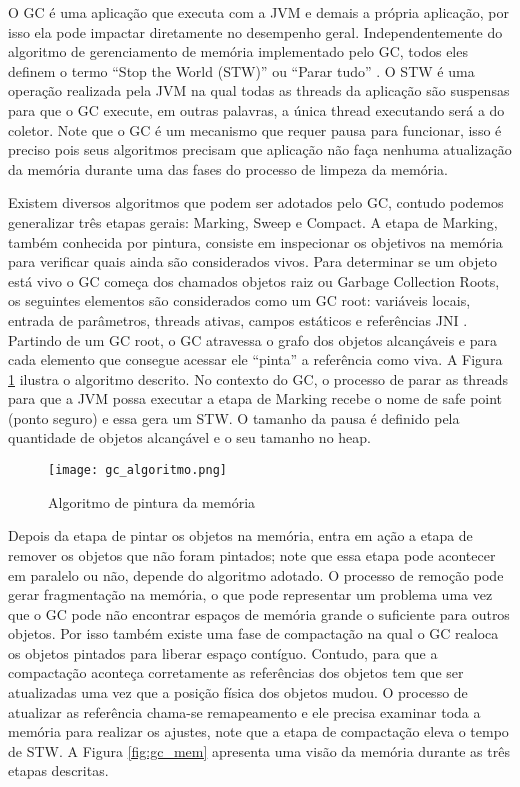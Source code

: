 O GC é uma aplicação que executa com a JVM e demais a própria aplicação, por
isso ela pode impactar diretamente no desempenho geral. Independentemente do
algoritmo de gerenciamento de memória implementado pelo GC, todos eles definem
o termo “Stop the World (STW)” ou “Parar tudo” \citep{gc_pauseless}. O STW é
uma operação realizada pela JVM  na qual todas as threads da aplicação são
suspensas para que o GC execute, em outras palavras, a única thread executando
será a do coletor. Note que o GC é um mecanismo que requer pausa para
funcionar, isso é preciso pois seus algoritmos precisam que aplicação não faça
nenhuma atualização da memória durante uma das fases do processo de limpeza da
memória.

Existem diversos algoritmos que podem ser adotados pelo GC, contudo podemos
generalizar três etapas gerais: Marking, Sweep e Compact. A etapa de Marking,
também conhecida por pintura, consiste em inspecionar os objetivos na memória
para verificar quais ainda são considerados vivos. Para determinar se um objeto
está vivo o GC começa dos chamados objetos raiz ou Garbage Collection Roots, os
seguintes elementos são considerados como um GC root: variáveis locais, entrada
de parâmetros, threads ativas, campos estáticos e referências JNI
\citep{gc_basics}. Partindo de um GC root, o GC atravessa o grafo dos objetos
alcançáveis e para cada elemento que consegue acessar ele “pinta” a referência
como viva. A Figura \ref{fig:gc_alg} ilustra o algoritmo descrito. No contexto
do GC, o processo de parar as threads para que a JVM possa executar a etapa de
Marking recebe o nome de safe point (ponto seguro) e essa gera um STW. O
tamanho da pausa é definido pela quantidade de objetos alcançável e o seu
tamanho no heap.

\begin{figure}[!h]
  \centering
  \texttt{[image: gc\_algoritmo.png]}
  \caption{Algoritmo de pintura da memória\citep{gc_basics}}
  \label{fig:gc_alg}
\end{figure}

Depois da etapa de pintar os objetos na memória, entra em ação a etapa de
remover os objetos que não foram pintados; note que essa etapa pode acontecer
em paralelo ou não, depende do algoritmo adotado. O processo de remoção pode
gerar fragmentação na memória, o que pode representar um problema uma vez que o
GC pode não encontrar espaços de memória grande o suficiente para outros
objetos. Por isso também existe uma fase de compactação na qual o GC realoca os
objetos pintados para liberar espaço contíguo. Contudo, para que a compactação
aconteça corretamente as referências dos objetos tem que ser atualizadas uma
vez que a posição física dos objetos mudou. O processo de atualizar as
referência chama-se remapeamento e ele precisa examinar toda a memória para
realizar os ajustes, note que a etapa de compactação eleva o tempo de STW. A
Figura \ref{fig:gc_mem} apresenta uma visão da memória durante as três etapas
descritas.

